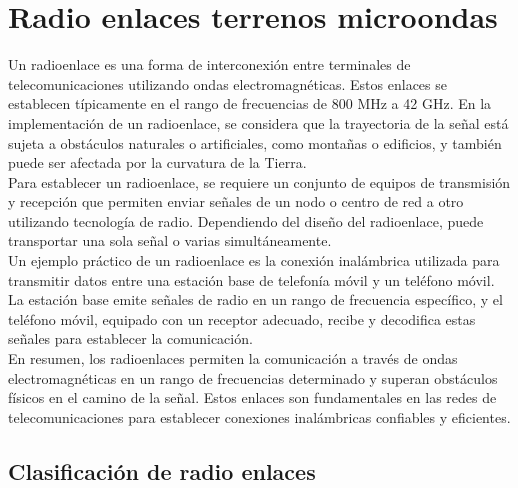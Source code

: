 \documentclass[
	12pt, %
	fleqn, %
	a4paper, %
	oneside, %
]{LegrandOrangeBook}
\begin{document}
\section{Radio enlaces terrenos microondas}
Un radioenlace es una forma de interconexión entre terminales de telecomunicaciones utilizando ondas electromagnéticas. Estos enlaces se establecen típicamente en el rango de frecuencias de 800 MHz a 42 GHz. En la implementación de un radioenlace, se considera que la trayectoria de la señal está sujeta a obstáculos naturales o artificiales, como montañas o edificios, y también puede ser afectada por la curvatura de la Tierra.\\
Para establecer un radioenlace, se requiere un conjunto de equipos de transmisión y recepción que permiten enviar señales de un nodo o centro de red a otro utilizando tecnología de radio. Dependiendo del diseño del radioenlace, puede transportar una sola señal o varias simultáneamente.\\
Un ejemplo práctico de un radioenlace es la conexión inalámbrica utilizada para transmitir datos entre una estación base de telefonía móvil y un teléfono móvil. La estación base emite señales de radio en un rango de frecuencia específico, y el teléfono móvil, equipado con un receptor adecuado, recibe y decodifica estas señales para establecer la comunicación.\\
En resumen, los radioenlaces permiten la comunicación a través de ondas electromagnéticas en un rango de frecuencias determinado y superan obstáculos físicos en el camino de la señal. Estos enlaces son fundamentales en las redes de telecomunicaciones para establecer conexiones inalámbricas confiables y eficientes.
\subsection{Clasificación de radio enlaces}
\end{document}
